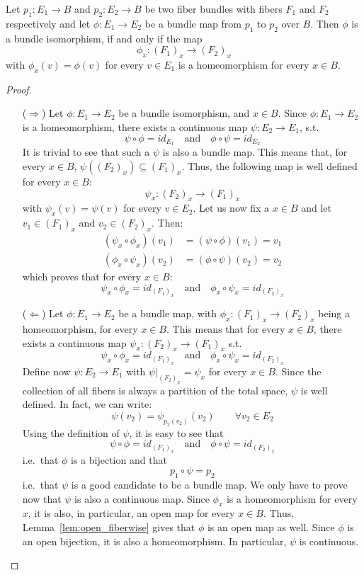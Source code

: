 \begin{proposition}
Let $p_1:E_1\to B$ and $p_2:E_2\to B$ be two fiber bundles with fibers $F_1$ and $F_2$ respectively and let $\phi:E_1\to E_2$ be a bundle map from $p_1$ to $p_2$ over $B$. Then $\phi$ is a bundle isomorphism, if and only if the map
\[\phi_x:{\left(F_1\right)}_x\to{\left(F_2\right)}_x\]
with $\phi_x(v)=\phi(v)$ for every $v\in E_1$ is a homeomorphism for every $x\in B$.
\end{proposition}
\begin{proof}
\begin{itemize}
\item[($\Rightarrow$)] Let $\phi:E_1\to E_2$ be a bundle isomorphism, and $x\in B$. Since $\phi:E_1\to E_2$ is a homeomorphism, there exists a continuous map $\psi:E_2\to E_1$, s.t.
\[\psi\circ\phi=id_{E_1}\quad\text{and}\quad\phi\circ\psi=id_{E_2}\]
It is trivial to see that such a $\psi$ is also a bundle map. This means that, for every $x\in B$, $\psi\left({(F_2)}_x\right)\subseteq{(F_1)}_x$. Thus, the following map is well defined for every $x\in B$:
\[\psi_x:{\left(F_2\right)}_x\to{\left(F_1\right)}_x\]
with $\psi_x(v)=\psi(v)$ for every $v\in E_2$. Let us now fix a $x\in B$ and let $v_1\in{(F_1)}_x$ and $v_2\in{(F_2)}_x$. Then:
\begin{align*}
\left(\psi_x\circ\phi_x\right)(v_1)&=\left(\psi\circ\phi\right)(v_1)=v_1\\
\left(\phi_x\circ\psi_x\right)(v_2)&=\left(\phi\circ\psi\right)(v_2)=v_2
\end{align*}
which proves that for every $x\in B$:
\[\psi_x\circ\phi_x=id_{{(F_1)}_x}\quad\text{and}\quad\phi_x\circ\psi_x=id_{{(F_2)}_x}\]
\item[($\Leftarrow$)] Let $\phi:E_1\to E_2$ be a bundle map, with $\phi_x:{(F_1)}_x\to{(F_2)}_x$ being a homeomorphism, for every $x\in B$. This means that for every $x\in B$,  there exists a continuous map $\psi_x:{(F_2)}_x\to{(F_1)}_x$ s.t.
\[\psi_x\circ\phi_x=id_{{(F_1)}_x}\quad\text{and}\quad\phi_x\circ\psi_x=id_{{(F_2)}_x}\]
Define now $\psi:E_2\to E_1$ with $\left.\psi\right|_{{(F_2)}_x}=\psi_x$ for every $x\in B$. Since the collection of all fibers is always a partition of the total space, $\psi$ is well defined. In fact, we can write:
\[\psi(v_2)=\psi_{p_2(v_2)}(v_2)\qquad\forall v_2\in E_2\]
Using the definition of $\psi$, it is easy to see that
\[\psi\circ\phi=id_{{(F_1)}_x}\quad\text{and}\quad\phi\circ\psi=id_{{(F_2)}_x}\]
i.e.\ that $\phi$ is a bijection and that
\[p_1\circ\psi=p_2\]
i.e.\ that $\psi$ is a good candidate to be a bundle map. We only have to prove now that $\psi$ is also a continuous map. Since $\phi_x$ is a homeomorphism for every $x$, it is also, in particular, an open map for every $x\in B$. Thus, Lemma~\ref{lem:open_fiberwise} gives that $\phi$ is an open map as well. Since $\phi$ is an open bijection, it is also a homeomorphism. In particular, $\psi$ is continuous.
\end{itemize}
\end{proof}
